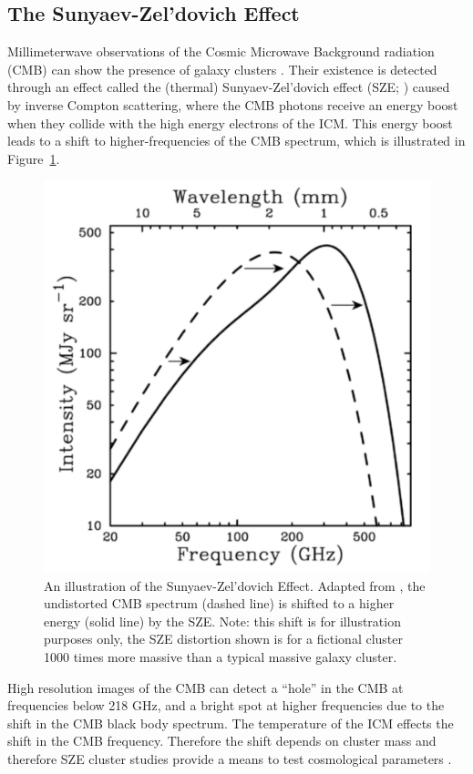 \subsection{The Sunyaev-Zel'dovich Effect}
Millimeterwave observations of the Cosmic Microwave Background radiation (CMB) can show the presence of galaxy clusters . Their existence is detected through an effect called the (thermal) Sunyaev-Zel'dovich effect (SZE; \citealt{Sunyaev1972}) caused by inverse Compton scattering, where the CMB photons receive an energy boost when they collide with the high energy electrons of the ICM. This energy boost leads to a shift to higher-frequencies of the CMB spectrum, which is illustrated in Figure~\ref{fig:sze}.
\begin{figure}[!ht]
	\begin{center}
		\includegraphics[height=0.5\textheight]{figures/sze.pdf}
	\end{center}
	\caption[An illustration of the Sunyaev-Zel'dovich Effect.]{An illustration of the Sunyaev-Zel'dovich Effect. Adapted from \cite{Carlstrom2002a}, the undistorted CMB spectrum (dashed line) is shifted to a higher energy (solid line) by the SZE. Note: this shift is for illustration purposes only, the SZE distortion shown is for a fictional cluster 1000 times more massive than a typical massive galaxy cluster.}
	\label{fig:sze}
\end{figure}
High resolution images of the CMB can detect a ``hole'' in the CMB at frequencies below 218 GHz, and a bright spot at higher frequencies due to the shift in the CMB black body spectrum. The temperature of the ICM effects the shift in the CMB frequency. Therefore the shift depends on cluster mass and therefore SZE cluster studies provide a means to test cosmological parameters . 

